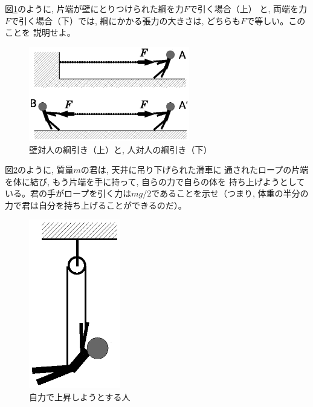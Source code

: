 \begin{q}\label{q:force_rope1}
図\ref{fig:string2}のように, 片端が壁にとりつけられた綱を力$F$で引く場合（上）
と, 両端を力$F$で引く場合（下）では, 綱にかかる張力の大きさは, どちらも$F$で等しい。このことを
説明せよ。
\begin{figure}[h]
    \centering
    \includegraphics[width=7cm]{string2.eps}
    \caption{壁対人の綱引き（上）と, 人対人の綱引き（下）}\label{fig:string2}
\end{figure}
\end{q}

%
\begin{q}\label{q:force_rope3}
図\ref{fig:string3}のように, 質量$m$の君は, 天井に吊り下げられた滑車に
通されたロープの片端を体に結び, もう片端を手に持って, 自らの力で自らの体を
持ち上げようとしている。君の手がロープを引く力は$mg/2$であることを示せ（つまり, 
体重の半分の力で君は自分を持ち上げることができるのだ）。
\begin{figure}[h]
    \centering
    \includegraphics[width=4cm]{string3.eps}
    \caption{自力で上昇しようとする人}\label{fig:string3}
\end{figure}
\end{q}
\mv

